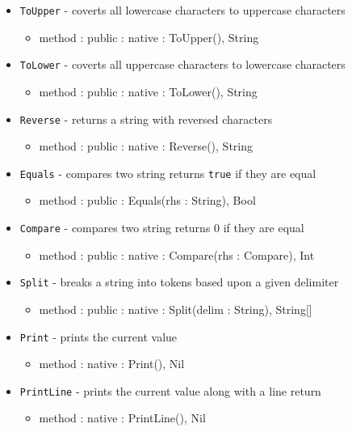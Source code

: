 \documentclass[12pt]{article}
\begin{document}
\begin{itemize}
\begin{itemize}
	\end{itemize}
    \item \texttt{ToUpper} - coverts all lowercase characters to uppercase characters
    	\begin{itemize}
	\item method : public : native : ToUpper(), String
	\end{itemize}
    \item \texttt{ToLower} - coverts all uppercase characters to lowercase characters
    	\begin{itemize}
	\item method : public : native : ToLower(), String
	\end{itemize}
     \item \texttt{Reverse} - returns a string with reversed characters
    	\begin{itemize}
	\item method : public : native : Reverse(), String
	\end{itemize}
    \item \texttt{Equals} - compares two string returns \texttt{true} if they are equal
    	\begin{itemize}
	\item method : public : Equals(rhs : String), Bool
	\end{itemize}
    \item \texttt{Compare} - compares two string returns 0 if they are equal
    	\begin{itemize}
	\item method : public : native : Compare(rhs : Compare), Int
	\end{itemize}
   
   \item \texttt{Split} - breaks a string into tokens based upon a given delimiter
    	\begin{itemize}
	\item method : public : native : Split(delim : String), String[]
	\end{itemize}
  
   \item \texttt{Print} - prints the current value
    	\begin{itemize}
	\item method : native : Print(), Nil
	\end{itemize}
   \item \texttt{PrintLine} - prints the current value along with a line return
    	\begin{itemize}
	\item method : native : PrintLine(), Nil
	\end{itemize}
\end{itemize}
\end{document}
